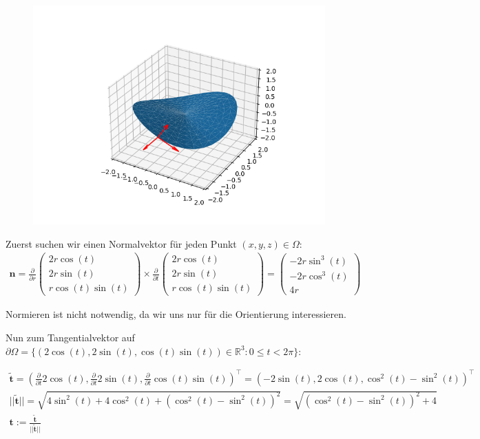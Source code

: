 \documentclass[]{article}
\begin{document}
\begin{figure}[h!]
	\includegraphics[width=0.7\columnwidth]{bsp_7.png}
\end{figure}

Zuerst suchen wir einen Normalvektor für jeden Punkt $(x,y,z)\in \Omega$:
\begin{align*}
	\bm{n} = \frac{\partial}{\partial r}\begin{pmatrix} 2r\cos(t)\\ 2r\sin(t)\\ r\cos(t)\sin(t) \end{pmatrix} \times \frac{\partial}{\partial t}\begin{pmatrix}
	2r\cos(t)\\ 2r\sin(t)\\ r\cos(t)\sin(t) \end{pmatrix} = \begin{pmatrix}
	-2r\sin^3(t)\\ -2r\cos^3(t)\\ 4r \end{pmatrix}
\end{align*}

Normieren ist nicht notwendig, da wir uns nur für die Orientierung interessieren. 

Nun zum Tangentialvektor auf $\partial\Omega = \{(2\cos(t), 2\sin(t), \cos(t)\sin(t))\in \mathbb{R}^3: 0 \leq t < 2\pi\}$:

\begin{align*}
	\tilde{\bm{t}} = \left(\frac{\partial}{\partial t} 2\cos(t), \frac{\partial}{\partial t} 2\sin(t), \frac{\partial}{\partial t} \cos(t)\sin(t)\right)^\top = (-2\sin(t), 2\cos(t), \cos^2(t)-\sin^2(t))^\top\\
	||\tilde{\bm{t}}|| = \sqrt{4\sin^2(t)+4\cos^2(t)+(\cos^2(t)-\sin^2(t))^2} = \sqrt{(\cos^2(t)-\sin^2(t))^2 + 4}\\
	\bm{t} := \frac{\tilde{\bm{t}}}{||\tilde{\bm{t}}||}
\end{align*}
\end{document}
